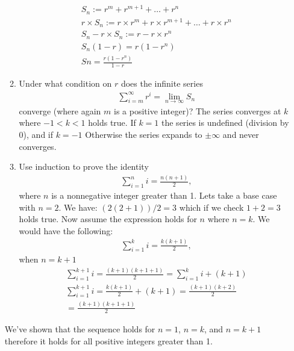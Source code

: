 \documentclass[12pt,twoside]{article}
\begin{document}
\begin{enumerate}
\begin{enumerate}
\begin{equation} \label{eq1}
\begin{split}
S_n := r^m + r^{m+1} + \dots + r^n \\ 
r\times S_n := r\times r^m + r\times r^{m+1} + \dots + r\times r^n \\
S_n - r\times S_n := r - r\times r^n \\
S_n(1-r) = r(1-r^n) \\ 
Sn = \frac{r(1-r^n)}{1-r}
\end{split}
\end{equation}

\item Under what condition on $r$ does the infinite series
\begin{align}
\sum_{i=m}^{\infty} r^{i} = \lim_{n \rightarrow \infty} S_n
\end{align}
converge (where again $m$ is a positive integer)?  
\subitem
The series converges at $k$ where $-1<k<1$ holds true. If $k=1$ the series is undefined (division by 0), and if $k=-1$ Otherwise the series expands to $\pm \infty$ and never converges.
\item Use induction to prove the identity
\begin{align}
\sum_{i=1}^{n} i = \frac{n(n+1)}{2},
\end{align}
where $n$ is a nonnegative integer greater than 1.
\subitem
Lets take a base case with $n=2$. We have: $(2(2+1))/2=3$ which if we check $1+2=3$ holds true.
Now assume the expression holds for $n$ where $n=k$. We would have the following:
\begin{align}
\sum_{i=1}^{k} i = \frac{k(k+1)}{2},
\end{align}
when $n = k+1$
\begin{equation}
    \begin{split}
    \sum_{i=1}^{k+1} i = \frac{(k+1)(k+1+1)}{2} =  \sum_{i=1}^{k} i +(k+1) \\
    \sum_{i=1}^{k+1} i = \frac{k(k+1)}{2} + (k+1) = \frac{(k+1)(k+2)}{2} \\
    = \frac{(k+1)(k+1+1)}{2}
    \end{split}
\end{equation}
\end{enumerate}
We've shown that the sequence holds for $n = 1$,  $n = k$, and $n=k+1$ therefore it holds for all positive integers greater than 1.

\break


\end{enumerate}
\end{document}
